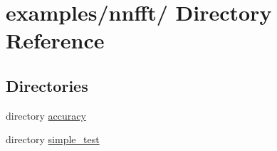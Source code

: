 \hypertarget{dir_000001}{
\section{examples/nnfft/ Directory Reference}
\label{dir_000001}
}
\subsection*{Directories}
\begin{CompactItemize}
\item 
directory \hyperlink{dir_000002}{accuracy}
\item 
directory \hyperlink{dir_000033}{simple\_\-test}
\end{CompactItemize}
